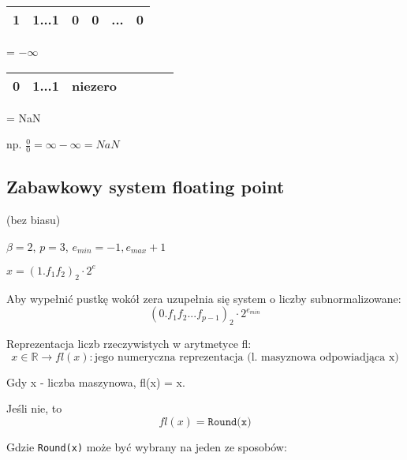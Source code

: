 \documentclass[hidelinks,a4paper,fleqn,oneside]{book}
\begin{document}
\begin{tabular}{|c|c|l|l|l|c|c|c|l|c|}
	\hline
	1 & \multicolumn{4}{c|}{1...1} & 0 & 0 & \multicolumn{2}{c|}{...} & 0 \\ \hline
\end{tabular} = $-\infty$

\begin{tabular}{|c|c|l|l|l|c|c|c|l|c|}
	\hline
	0 & \multicolumn{4}{c|}{1...1} & niezero \\ \hline
\end{tabular} = NaN

np. $\frac{0}{0} = \infty - \infty = NaN$

\subsection{Zabawkowy system floating point}

(bez biasu)

$\beta = 2$, $p = 3$, $e_{min} = -1, e_{max} + 1$

$x = (1.f_1f_2)_2 \cdot 2^{e}$



Aby wypełnić pustkę wokół zera uzupełnia się system o liczby subnormalizowane:
\[
	(0.f_1f_2...f_{p-1})_2 \cdot 2^{e_{min}}
\]

Reprezentacja liczb rzeczywistych w arytmetyce fl:
\[
	x \in \mathbb{R} \rightarrow fl(x) : \textrm{jego numeryczna reprezentacja (l. masyznowa odpowiadjąca x)}
\]

Gdy x - liczba maszynowa, fl(x) = x.

Jeśli nie, to
\[
	fl(x) = \texttt{Round(x)}
\]

Gdzie \texttt{Round(x)} może być wybrany na jeden ze sposobów:
\end{document}
